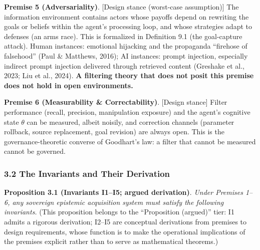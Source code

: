 \documentclass[
  11pt]{article}
\begin{document}
\textbf{Premise 5 (Adversariality)}. {[}Design stance (worst-case
assumption){]} The information environment contains actors whose payoffs
depend on rewriting the goals or beliefs within the agent's processing
loop, and whose strategies adapt to defenses (an arms race). This is
formalized in Definition 9.1 (the goal-capture attack). Human instances:
emotional hijacking and the propaganda ``firehose of falsehood'' (Paul
\& Matthews, 2016); AI instances: prompt injection, especially indirect
prompt injection delivered through retrieved content (Greshake et al.,
2023; Liu et al., 2024). \textbf{A filtering theory that does not posit
this premise does not hold in open environments.}

\textbf{Premise 6 (Measurability \& Correctability)}. {[}Design
stance{]} Filter performance (recall, precision, manipulation exposure)
and the agent's cognitive state \(\theta\) can be measured, albeit
noisily, and correction channels (parameter rollback, source
replacement, goal revision) are always open. This is the
governance-theoretic converse of Goodhart's law: a filter that cannot be
measured cannot be governed.

\subsubsection{3.2 The Invariants and Their
Derivation}\label{the-invariants-and-their-derivation}

\textbf{Proposition 3.1 (Invariants I1--I5; argued derivation)}.
\emph{Under Premises 1--6, any sovereign epistemic acquisition system
must satisfy the following invariants.} (This proposition belongs to the
``Proposition (argued)'' tier: I1 admits a rigorous derivation; I2--I5
are conceptual derivations from premises to design requirements, whose
function is to make the operational implications of the premises
explicit rather than to serve as mathematical theorems.)
\end{document}
